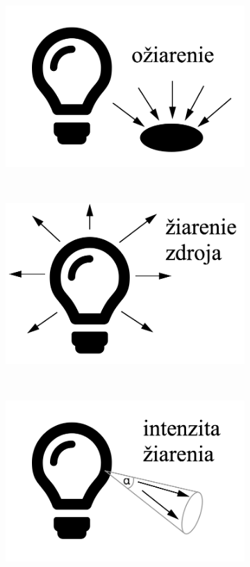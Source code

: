 \begin{figure}[h!]
    \centering
    \begin{subfigure}{0.2\textwidth}
        \includegraphics[width=\textwidth]{figures/light/irradiance}
    \end{subfigure}
    ~
    \begin{subfigure}{0.2\textwidth}
        \includegraphics[width=\textwidth]{figures/light/radiant_exitance}
    \end{subfigure}
    ~
    \begin{subfigure}{0.2\textwidth}
        \includegraphics[width=\textwidth]{figures/light/radiant_intensity}

\end{subfigure}
\end{figure}
